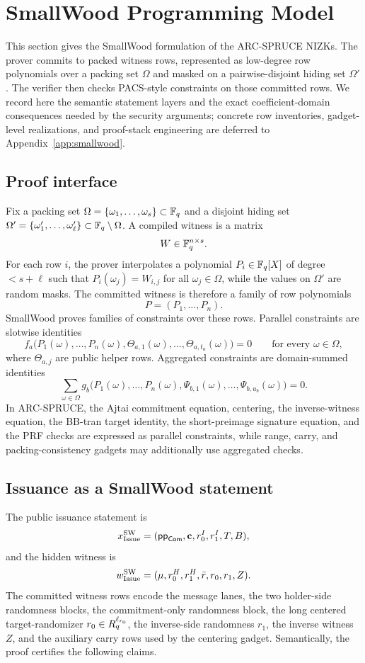 \section{SmallWood Programming Model}
\label{sec:smallwood-model}
\label{sec:smallwood}

This section gives the SmallWood formulation of the ARC-SPRUCE NIZKs.  The prover commits to packed
witness rows, represented as low-degree row polynomials over a packing set $\Omega$ and masked on a
pairwise-disjoint hiding set $\Omega'$.  The verifier then checks PACS-style constraints on those committed
rows.  We record here the semantic statement layers and the exact coefficient-domain consequences needed by
the security arguments; concrete row inventories, gadget-level realizations, and proof-stack engineering are
deferred to Appendix~\ref{app:smallwood}.

\subsection{Proof interface}
\label{subsec:smallwood-interface}
Fix a packing set $\Omega=\{\omega_1,\ldots,\omega_s\}\subset\mathbb{F}_q$ and a disjoint hiding set
$\Omega'=\{\omega'_1,\ldots,\omega'_\ell\}\subset\mathbb{F}_q\setminus\Omega$.  A compiled witness is a matrix
\[
W\in\mathbb{F}_q^{n\times s}.
\]
For each row $i$, the prover interpolates a polynomial $P_i\in\mathbb{F}_q[X]$ of degree $<s+\ell$ such that
$P_i(\omega_j)=W_{i,j}$ for all $\omega_j\in\Omega$, while the values on $\Omega'$ are random masks.  The
committed witness is therefore a family of row polynomials
\[
P=(P_1,\ldots,P_n).
\]
SmallWood proves families of constraints over these rows.  Parallel constraints are slotwise identities
\[
  f_a\bigl(P_1(\omega),\ldots,P_n(\omega),\Theta_{a,1}(\omega),\ldots,\Theta_{a,t_a}(\omega)\bigr)=0
  \qquad\text{for every }\omega\in\Omega,
\]
where $\Theta_{a,j}$ are public helper rows.  Aggregated constraints are domain-summed identities
\[
  \sum_{\omega\in\Omega}
  g_b\bigl(P_1(\omega),\ldots,P_n(\omega),\Psi_{b,1}(\omega),\ldots,\Psi_{b,u_b}(\omega)\bigr)=0.
\]
In ARC-SPRUCE, the Ajtai commitment equation, centering, the inverse-witness equation, the BB-tran target
identity, the short-preimage signature equation, and the PRF checks are expressed as parallel constraints, while
range, carry, and packing-consistency gadgets may additionally use aggregated checks.

\subsection{Issuance as a SmallWood statement}
\label{subsec:smallwood-issuance}
\label{subsec:presign-compiled}
The public issuance statement is
\[
  x^{\mathrm{SW}}_{\mathrm{Issue}}=(\mathsf{pp}_{\mathsf{Com}},\mathbf{c},r_0^I,r_1^I,T,B),
\]
and the hidden witness is
\[
  w^{\mathrm{SW}}_{\mathrm{Issue}}=(\mathbf{\mu},r_0^H,r_1^H,\bar r,r_0,r_1,Z).
\]
The committed witness rows encode the message lanes, the two holder-side randomness blocks, the commitment-only
randomness block, the long centered target-randomizer $r_0\in R_q^{\ell_{r_0}}$, the inverse-side randomness $r_1$, the inverse witness $Z$, and the auxiliary carry rows used
by the centering gadget.  Semantically, the proof certifies the following claims.

